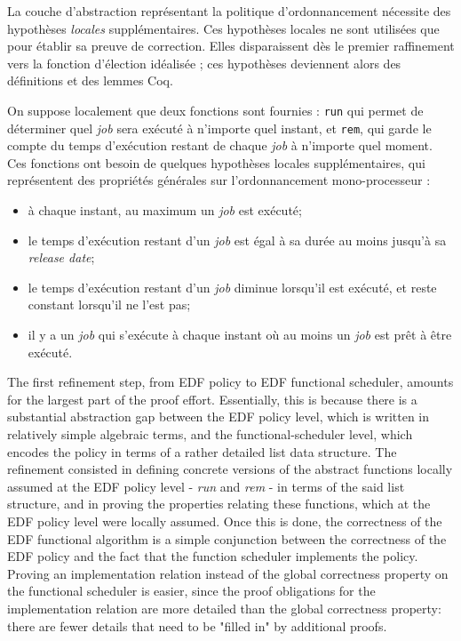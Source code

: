 	La couche d'abstraction représentant la politique d'ordonnancement nécessite des hypothèses \emph{locales} supplémentaires. Ces hypothèses locales ne sont utilisées que pour établir sa preuve de correction. Elles disparaissent dès le premier raffinement vers la fonction d'élection idéalisée ; ces hypothèses deviennent alors des définitions et des lemmes Coq.

	On suppose localement que deux fonctions sont fournies : \texttt{run} qui permet de déterminer quel \emph{job} sera exécuté à n'importe quel instant, et \texttt{rem}, qui garde le compte du temps d'exécution restant de chaque \emph{job} à n'importe quel moment.
	Ces fonctions ont besoin de quelques hypothèses locales supplémentaires, qui représentent des propriétés générales sur l'ordonnancement mono-processeur :
	
	\begin{itemize}
		\item à chaque instant, au maximum un \emph{job} est exécuté;
		\item le temps d'exécution restant d'un \emph{job} est égal à sa durée au moins jusqu'à sa \emph{release date};
		\item le temps d'exécution restant d'un \emph{job} diminue lorsqu'il est exécuté, et reste constant lorsqu'il ne l'est pas;
		\item il y a un \emph{job} qui s'exécute à chaque instant où au moins un \emph{job} est prêt à être exécuté.
	\end{itemize}



	The first refinement step, from EDF policy to EDF functional scheduler, amounts for the largest part of the proof effort. Essentially, this is because there is a substantial abstraction gap between the EDF policy level, which is written in relatively simple algebraic terms, and the functional-scheduler level, which encodes the policy in terms of a rather detailed list data structure. The refinement consisted in defining concrete versions of the abstract functions locally assumed at the EDF policy level - \emph{run} and \emph{rem} - in terms of the said list structure, and in proving the properties relating these functions, which at the EDF policy level were locally assumed. Once this is done, the correctness of the EDF functional algorithm is a simple conjunction between the correctness of the EDF policy and the fact that the function scheduler implements the policy. Proving an implementation relation instead of the global correctness property on the functional scheduler is easier, since the proof obligations for the implementation relation are more detailed than the global correctness property: there are fewer details that need to be "filled in" by additional proofs.

